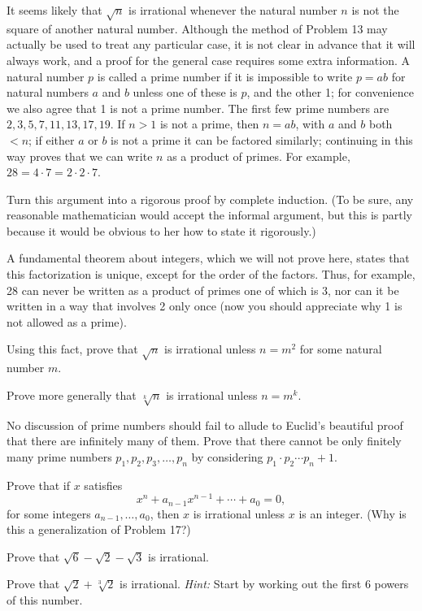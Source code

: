  It seems likely that $\sqrt{n}$ is irrational whenever the natural
number $n$ is not the square of another natural number. Although the method
of Problem 13 may actually be used to treat any particular case, it is not
clear in advance that it will always work, and a proof for the general case
requires some extra information. A natural number $p$ is called a prime
number if it is impossible to write $p = ab$ for natural numbers $a$ and $b$
unless one of these is $p$, and the other 1; for convenience we also agree
that 1 is not a prime number. The first few prime numbers are
$2, 3, 5, 7, 11, 13, 17, 19$. If $n > 1$ is not a prime, then $n = ab$, with
$a$ and $b$ both $< n$; if either $a$ or $b$ is not a prime it can be factored
similarly; continuing in this way proves that we can write $n$ as a product
of primes. For example, $28 = 4 \cdot 7 = 2 \cdot 2 \cdot 7$.

\begin{letters}
\item Turn this argument into a rigorous proof by complete induction. (To be
  sure, any reasonable mathematician would accept the informal argument, but
  this is partly because it would be obvious to her how to state it
  rigorously.)

A fundamental theorem about integers, which we will not prove here, states
that this factorization is unique, except for the order of the factors. Thus,
for example, 28 can never be written as a product of primes one of which is
3, nor can it be written in a way that involves 2 only once (now you should
appreciate why 1 is not allowed as a prime).
\item Using this fact, prove that $\sqrt{n}$ is irrational unless $n = m^2$
  for some natural number $m$.
\item Prove more generally that $\sqrt[k]{n}$ is irrational unless $n = m^k$.
\item No discussion of prime numbers should fail to allude to Euclid's
  beautiful proof that there are infinitely many of them. Prove that there
  cannot be only finitely many prime numbers $p_1, p_2, p_3, \dots, p_n$ by
  considering $p_1 \cdot p_2 \cdots p_n + 1$.
\end{letters}

\begin{letters}
\item Prove that if $x$ satisfies
\[ x^n + a_{n-1} x^{n-1} + \cdots + a_0 = 0, \]
for some integers $a_{n-1}, \dots, a_0$, then $x$ is irrational unless $x$ is
an integer. (Why is this a generalization of Problem 17?)
\item Prove that $\sqrt{6} - \sqrt{2} - \sqrt{3}$ is irrational.
\item Prove that $\sqrt{2} + \sqrt[3]{2}$ is irrational. \textit{Hint:} Start
  by working out the first 6 powers of this number.
\end{letters}

